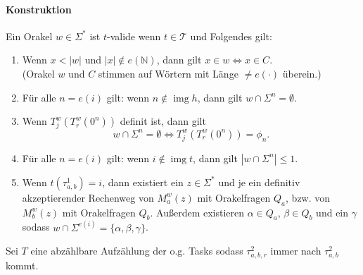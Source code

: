\documentclass[nofonts]{uebung}
\def\P{\ensuremath{\mathrm{P}}}
\def\NP{\ensuremath{\mathrm{NP}}}
\def\coNP{\ensuremath{\mathrm{coNP}}}
\DeclareMathOperator{\img}{img}
\begin{document}



\paragraph{Konstruktion} 

Ein Orakel $w\in\Sigma^*$ ist $t$-valide wenn $t\in\mathcal T$ und Folgendes gilt:
\begin{enumerate}[label={V\arabic*}]
    \item Wenn $x<|w|$ und $|x|\not\in e(\mathbb N)$, dann gilt $x\in w\iff x\in C$.\\
        (Orakel $w$ und $C$ stimmen auf Wörtern mit Länge $\neq e(\cdot)$ überein.)
    \item Für alle $n=e(i)$ gilt: wenn $n\not\in\img h$, dann gilt $w\cap \Sigma^n=\emptyset$.
    \item Wenn $T_j^w(T_r^w(0^n))$ definit ist, dann gilt 
        \[ w\cap\Sigma^{n} = \emptyset \iff T_j^w(T_r^w(0^n))=\phi_n. \]
    \item Für alle $n=e(i)$ gilt: wenn $i\not\in\img t$, dann gilt $|w\cap \Sigma^n|\leq 1$.
    \item Wenn $t(\tau^1_{a,b})=i$, dann existiert ein $z\in \Sigma^*$ und je ein definitiv akzeptierender Rechenweg von $M_a^w(z)$ mit Orakelfragen $Q_a$, bzw. von  $M_b^w(z)$ mit Orakelfragen $Q_b$.
        Außerdem existieren $\alpha\in Q_a$, $\beta\in Q_b$ und ein $\gamma$ sodass $w\cap\Sigma^{e(i)} = \{\alpha,\beta,\gamma\}$.
\end{enumerate}

Sei $T$ eine abzählbare Aufzählung der o.g. Tasks sodass $\tau^2_{a,b,r}$ immer nach $\tau^2_{a,b}$ kommt.
\end{document}
